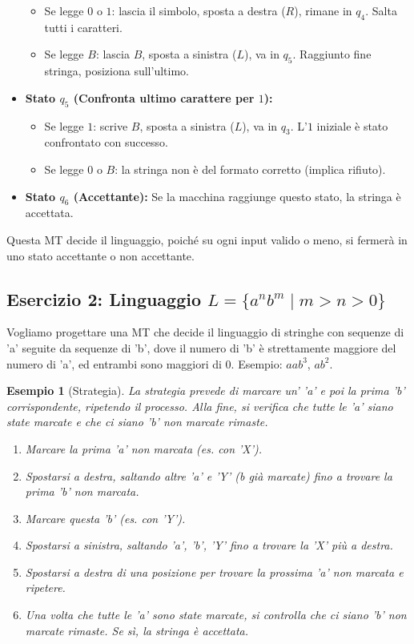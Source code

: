 \documentclass[a4paper]{article}
\newtheorem{example}{Esempio}
\begin{document}
\begin{itemize}
    \begin{itemize}
        \item Se legge $0$ o $1$: lascia il simbolo, sposta a destra ($R$), rimane in $q_4$. Salta tutti i caratteri.
        \item Se legge $B$: lascia $B$, sposta a sinistra ($L$), va in $q_5$. Raggiunto fine stringa, posiziona sull'ultimo.
    \end{itemize}
    \item \textbf{Stato $q_5$ (Confronta ultimo carattere per $1$):}
    \begin{itemize}
        \item Se legge $1$: scrive $B$, sposta a sinistra ($L$), va in $q_3$. L'$1$ iniziale è stato confrontato con successo.
        \item Se legge $0$ o $B$: la stringa non è del formato corretto (implica rifiuto).
    \end{itemize}
    \item \textbf{Stato $q_6$ (Accettante):} Se la macchina raggiunge questo stato, la stringa è accettata.
\end{itemize}
Questa MT decide il linguaggio, poiché su ogni input valido o meno, si fermerà in uno stato accettante o non accettante.

\subsection{Esercizio 2: Linguaggio $L = \{a^n b^m \mid m > n > 0\}$}

Vogliamo progettare una MT che decide il linguaggio di stringhe con sequenze di 'a' seguite da sequenze di 'b', dove il numero di 'b' è strettamente maggiore del numero di 'a', ed entrambi sono maggiori di $0$. Esempio: $aab^{3}$, $ab^{2}$.

\begin{example}[Strategia]
La strategia prevede di marcare un' 'a' e poi la prima 'b' corrispondente, ripetendo il processo. Alla fine, si verifica che tutte le 'a' siano state marcate e che ci siano 'b' non marcate rimaste.
\begin{enumerate}
    \item Marcare la prima 'a' non marcata (es. con 'X').
    \item Spostarsi a destra, saltando altre 'a' e 'Y' (b già marcate) fino a trovare la prima 'b' non marcata.
    \item Marcare questa 'b' (es. con 'Y').
    \item Spostarsi a sinistra, saltando 'a', 'b', 'Y' fino a trovare la 'X' più a destra.
    \item Spostarsi a destra di una posizione per trovare la prossima 'a' non marcata e ripetere.
    \item Una volta che tutte le 'a' sono state marcate, si controlla che ci siano 'b' non marcate rimaste. Se sì, la stringa è accettata.
\end{enumerate}
\end{example}
\end{document}
